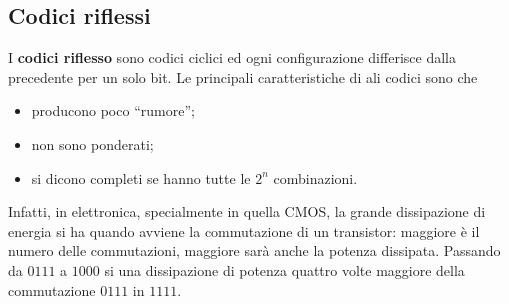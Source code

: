 \documentclass[a4paper]{extarticle}
\newcommand{\quotes}[1]{``#1''}
\begin{document}
\subsection{Codici riflessi}
I \textbf{codici riflesso} sono codici ciclici ed ogni configurazione differisce dalla precedente per un solo bit. Le principali caratteristiche di ali codici sono che
\begin{itemize}
    \item producono poco \quotes{rumore};
    \item non sono ponderati;
    \item si dicono completi se hanno tutte le $2^n$ combinazioni.
\end{itemize}
Infatti, in elettronica, specialmente in quella CMOS, la grande dissipazione di energia si ha quando avviene la commutazione di un transistor: maggiore è il numero delle commutazioni, maggiore sarà anche la potenza dissipata. Passando da $0111$ a $1000$ si una dissipazione di potenza quattro volte maggiore della commutazione $0111$ in $1111$.
\end{document}

